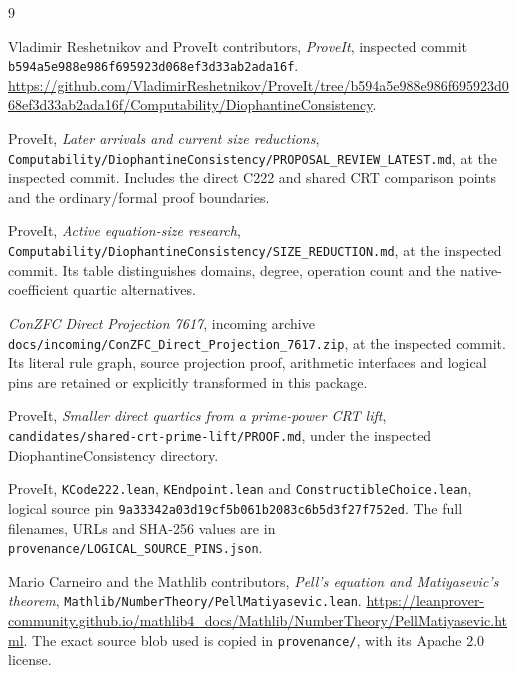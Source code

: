 \documentclass[11pt]{article}
\theoremstyle{definition}
\theoremstyle{remark}
\newcommand{\File}[1]{\nolinkurl{#1}}
\begin{document}
\clearpage
\begin{thebibliography}{9}
\raggedright
{}
Vladimir Reshetnikov and ProveIt contributors,
\emph{ProveIt}, inspected commit
\texttt{b594a5e988e986f695923d068ef3d33ab2ada16f}.
\url{https://github.com/VladimirReshetnikov/ProveIt/tree/b594a5e988e986f695923d068ef3d33ab2ada16f/Computability/DiophantineConsistency}.

ProveIt, \emph{Later arrivals and current size reductions},
\File{Computability/DiophantineConsistency/PROPOSAL_REVIEW_LATEST.md},
at the inspected commit. Includes the direct C222 and shared CRT
comparison points and the ordinary/formal proof boundaries.

ProveIt, \emph{Active equation-size research},
\File{Computability/DiophantineConsistency/SIZE_REDUCTION.md},
at the inspected commit. Its table distinguishes domains, degree,
operation count and the native-coefficient quartic alternatives.

\emph{ConZFC Direct Projection 7617}, incoming archive
\File{docs/incoming/ConZFC_Direct_Projection_7617.zip},
at the inspected commit. Its literal rule graph, source projection proof,
arithmetic interfaces and logical pins are retained or explicitly
transformed in this package.

ProveIt, \emph{Smaller direct quartics from a prime-power CRT lift},
\File{candidates/shared-crt-prime-lift/PROOF.md},
under the inspected DiophantineConsistency directory.

ProveIt, \File{KCode222.lean}, \File{KEndpoint.lean} and
\File{ConstructibleChoice.lean}, logical source pin
\texttt{9a33342a03d19cf5b061b2083c6b5d3f27f752ed}.
The full filenames, URLs and SHA-256 values are in
\File{provenance/LOGICAL_SOURCE_PINS.json}.

Mario Carneiro and the Mathlib contributors,
\emph{Pell's equation and Matiyasevic's theorem},
\File{Mathlib/NumberTheory/PellMatiyasevic.lean}.
\url{https://leanprover-community.github.io/mathlib4_docs/Mathlib/NumberTheory/PellMatiyasevic.html}.
The exact source blob used is copied in \File{provenance/}, with its
Apache 2.0 license.
\end{thebibliography}
\end{document}
